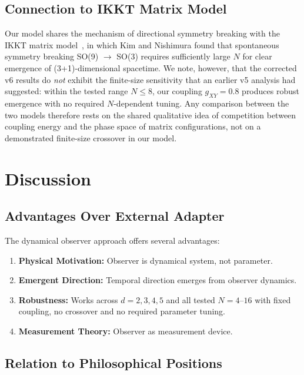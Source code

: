 \documentclass[12pt,a4paper]{article}
\begin{document}
\subsection{Connection to IKKT Matrix Model}

Our model shares the mechanism of directional symmetry breaking with the IKKT
matrix model~\cite{kim_nishimura_2011, kim_nishimura_2012}, in which Kim and
Nishimura found that spontaneous symmetry breaking
SO(9) $\rightarrow$ SO(3) requires sufficiently large $N$ for clear emergence
of (3+1)-dimensional spacetime. We note, however, that the corrected v6
results do \emph{not} exhibit the finite-size sensitivity that an earlier v5
analysis had suggested: within the tested range $N \leq 8$, our coupling
$g_{XY}=0.8$ produces robust emergence with no required $N$-dependent tuning.
Any comparison between the two models therefore rests on the shared
qualitative idea of competition between coupling energy and the phase space
of matrix configurations, not on a demonstrated finite-size crossover in our
model.

\section{Discussion}\label{sec:discussion}

\subsection{Advantages Over External Adapter}

The dynamical observer approach offers several advantages:

\begin{enumerate}[leftmargin=*]
\item \textbf{Physical Motivation:} Observer is dynamical system, not parameter.
\item \textbf{Emergent Direction:} Temporal direction emerges from observer dynamics.
\item \textbf{Robustness:} Works across $d = 2,3,4,5$ and all tested $N = 4$--$16$ with
      fixed coupling, no crossover and no required parameter tuning.
\item \textbf{Measurement Theory:} Observer as measurement device.
\end{enumerate}

\subsection{Relation to Philosophical Positions}
\end{document}
